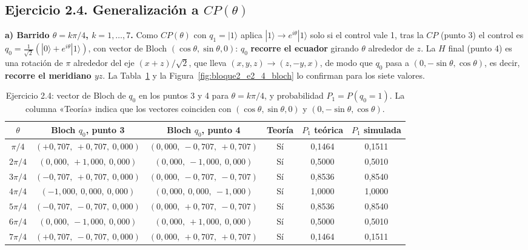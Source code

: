 \subsection{Ejercicio 2.4. Generalización a \texorpdfstring{$CP(\theta)$}{CP(theta)}}

\textbf{a) Barrido $\theta=k\pi/4$, $k=1,\dots,7$.} Como $CP(\theta)$ con $q_1=|1\rangle$ aplica $|1\rangle\to e^{i\theta}|1\rangle$ solo si el control vale 1, tras la $CP$ (punto 3) el control es $q_0=\tfrac{1}{\sqrt2}(|0\rangle+e^{i\theta}|1\rangle)$, con vector de Bloch $(\cos\theta,\sin\theta,0)$: $q_0$ \textbf{recorre el ecuador} girando $\theta$ alrededor de $z$. La $H$ final (punto 4) es una rotación de $\pi$ alrededor del eje $(x+z)/\sqrt2$, que lleva $(x,y,z)\to(z,-y,x)$, de modo que $q_0$ pasa a $(0,-\sin\theta,\cos\theta)$, es decir, \textbf{recorre el meridiano $yz$}. La Tabla~\ref{tab:bloque2_e2_4} y la Figura~\ref{fig:bloque2_e2_4_bloch} lo confirman para los siete valores.

\begin{table}[htbp]
    \centering
    {\small\setlength{\tabcolsep}{4pt}
    \begin{tabular}{c|c|c|c|c|c}
    \hline
    $\theta$ & Bloch $q_0$, punto 3 & Bloch $q_0$, punto 4 & Teoría & $P_1$ teórica & $P_1$ simulada \\
    \hline
    $\pi/4$   & $(+0{,}707,\ +0{,}707,\ 0{,}000)$ & $(0{,}000,\ -0{,}707,\ +0{,}707)$ & Sí & 0,1464 & 0,1511 \\
    $2\pi/4$  & $(0{,}000,\ +1{,}000,\ 0{,}000)$  & $(0{,}000,\ -1{,}000,\ 0{,}000)$  & Sí & 0,5000 & 0,5010 \\
    $3\pi/4$  & $(-0{,}707,\ +0{,}707,\ 0{,}000)$ & $(0{,}000,\ -0{,}707,\ -0{,}707)$ & Sí & 0,8536 & 0,8540 \\
    $4\pi/4$  & $(-1{,}000,\ 0{,}000,\ 0{,}000)$  & $(0{,}000,\ 0{,}000,\ -1{,}000)$  & Sí & 1,0000 & 1,0000 \\
    $5\pi/4$  & $(-0{,}707,\ -0{,}707,\ 0{,}000)$ & $(0{,}000,\ +0{,}707,\ -0{,}707)$ & Sí & 0,8536 & 0,8540 \\
    $6\pi/4$  & $(0{,}000,\ -1{,}000,\ 0{,}000)$  & $(0{,}000,\ +1{,}000,\ 0{,}000)$  & Sí & 0,5000 & 0,5010 \\
    $7\pi/4$  & $(+0{,}707,\ -0{,}707,\ 0{,}000)$ & $(0{,}000,\ +0{,}707,\ +0{,}707)$ & Sí & 0,1464 & 0,1511 \\
    \hline
    \end{tabular}}
    \caption{Ejercicio 2.4: vector de Bloch de $q_0$ en los puntos 3 y 4 para $\theta=k\pi/4$, y probabilidad $P_1=P(q_0=1)$. La columna «Teoría» indica que los vectores coinciden con $(\cos\theta,\sin\theta,0)$ y $(0,-\sin\theta,\cos\theta)$.}\label{tab:bloque2_e2_4}
\end{table}

